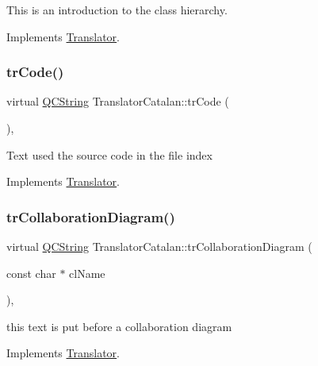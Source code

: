 This is an introduction to the class hierarchy. 

Implements \mbox{\hyperlink{class_translator}{Translator}}.

\mbox{\label{class_translator_catalan_aad7bc2b810b3a9e21a675b1b52fd2b59}} 
\subsubsection{\texorpdfstring{trCode()}{trCode()}}
{\footnotesize\ttfamily virtual \mbox{\hyperlink{class_q_c_string}{Q\+C\+String}} Translator\+Catalan\+::tr\+Code (\begin{DoxyParamCaption}{ }\end{DoxyParamCaption})\hspace{0.3cm}{\ttfamily [inline]}, {\ttfamily [virtual]}}

Text used the source code in the file index 

Implements \mbox{\hyperlink{class_translator}{Translator}}.

\mbox{\label{class_translator_catalan_a3d10313d698a5b3c7861bdf57f1a5c48}} 
\subsubsection{\texorpdfstring{trCollaborationDiagram()}{trCollaborationDiagram()}}
{\footnotesize\ttfamily virtual \mbox{\hyperlink{class_q_c_string}{Q\+C\+String}} Translator\+Catalan\+::tr\+Collaboration\+Diagram (\begin{DoxyParamCaption}\item[{const char $\ast$}]{cl\+Name }\end{DoxyParamCaption})\hspace{0.3cm}{\ttfamily [inline]}, {\ttfamily [virtual]}}

this text is put before a collaboration diagram 

Implements \mbox{\hyperlink{class_translator}{Translator}}.

\mbox{\label{class_translator_catalan_ae2edd534da91df35c1f7f65468906748}} 

